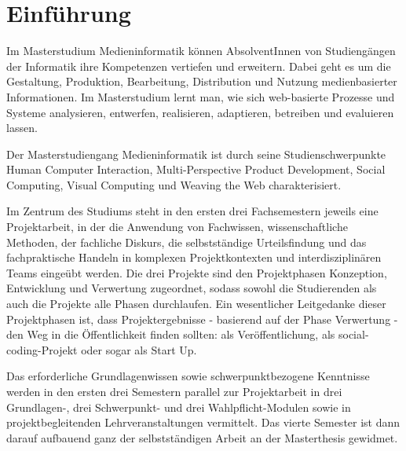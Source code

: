 \chapter{Einführung\label{/mi-2017/modulbeschreibungen-master/schwerpunkte-einfuehrung}}\label{einfuxfchrungpathlabelmi-2017modulbeschreibungen-masterschwerpunkte-einfuehrung}

Im Masterstudium Medieninformatik können AbsolventInnen von
Studiengängen der Informatik ihre Kompetenzen vertiefen und erweitern.
Dabei geht es um die Gestaltung, Produktion, Bearbeitung, Distribution
und Nutzung medienbasierter Informationen. Im Masterstudium lernt man,
wie sich web-basierte Prozesse und Systeme analysieren, entwerfen,
realisieren, adaptieren, betreiben und evaluieren lassen.

Der Masterstudiengang Medieninformatik ist durch seine
Studienschwerpunkte Human Computer Interaction, Multi-Perspective
Product Development, Social Computing, Visual Computing und Weaving the
Web charakterisiert.

Im Zentrum des Studiums steht in den ersten drei Fachsemestern jeweils
eine Projektarbeit, in der die Anwendung von Fachwissen,
wissenschaftliche Methoden, der fachliche Diskurs, die selbstständige
Urteilsfindung und das fachpraktische Handeln in komplexen
Projektkontexten und interdisziplinären Teams eingeübt werden. Die drei
Projekte sind den Projektphasen Konzeption, Entwicklung und Verwertung
zugeordnet, sodass sowohl die Studierenden als auch die Projekte alle
Phasen durchlaufen. Ein wesentlicher Leitgedanke dieser Projektphasen
ist, dass Projektergebnisse - basierend auf der Phase Verwertung - den
Weg in die Öffentlichkeit finden sollten: als Veröffentlichung, als
social-coding-Projekt oder sogar als Start Up.

Das erforderliche Grundlagenwissen sowie schwerpunktbezogene Kenntnisse
werden in den ersten drei Semestern parallel zur Projektarbeit in drei
Grundlagen-, drei Schwerpunkt- und drei Wahlpflicht-Modulen sowie in
projektbegleitenden Lehrveranstaltungen vermittelt. Das vierte Semester
ist dann darauf aufbauend ganz der selbstständigen Arbeit an der
Masterthesis gewidmet.

